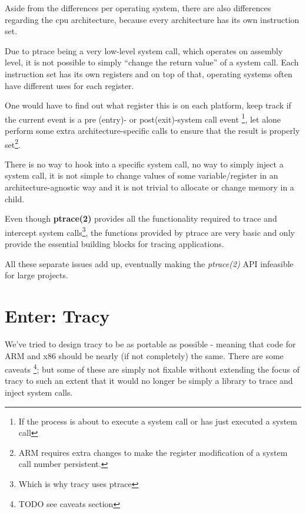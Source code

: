 \documentclass[a4paper, 10pt]{report}
\begin{document}
Aside from the differences per operating system, there are also differences
regarding the cpu architecture, because every architecture has its own
instruction set.

Due to ptrace being a very low-level system call, which operates on assembly
level, it is not possible to simply ``change the return value'' of a system
call. Each instruction set has its own registers and on top of that, operating
systems often have different uses for each register.


One would have to find out what register this is on each platform,
keep track if the current event is a pre (entry)- or post(exit)-system
call event
\footnote{If the process is about to execute a system call or has just
executed a system call}, let alone
perform some extra architecture-specific calls to ensure that the result is
properly set\footnote{ARM requires extra changes to make the register
modification of a system call number persistent.}.

There is no way to hook into a specific system call, no way
to simply inject a system call, it is not simple to change values of some
variable/register in an architecture-agnostic way and it is not trivial
to allocate or change memory in a child.

Even though \textbf{ptrace(2)} provides all the functionality required to
trace and intercept system calls\footnote{Which is why tracy uses ptrace},
the functions provided by ptrace are very basic and only provide the
essential building blocks for tracing applications.

All these separate issues add up, eventually making the \textit{ptrace(2)} API
infeasible for large projects. %

\section{Enter: Tracy}

We've tried to design tracy to be as portable as possible - meaning that code
for ARM and x86 should be nearly (if not completely) the same. There are some
caveats \footnote{TODO see caveats section}; but some of these are simply not
fixable without extending the focus of tracy to such an extent that it would no
longer be simply a library to trace and inject system calls.
\end{document}
